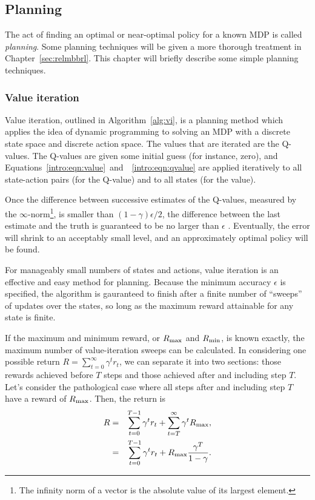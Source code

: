 \subsection{Planning}

The act of finding an optimal or near-optimal policy for a known MDP is called \emph{planning}. Some planning techniques will be given a more thorough treatment in Chapter~\ref{sec:relmbbrl}. This chapter will briefly describe some simple planning techniques.

\subsubsection{Value iteration}

Value iteration, outlined in Algorithm~\ref{alg:vi}, is a planning method which applies the idea of dynamic programming to solving an MDP with a discrete state space and discrete action space. The values that are iterated are the Q-values. The Q-values are given some initial guess (for instance, zero), and Equations~\ref{intro:eqn:value}~and~~\ref{intro:eqn:qvalue} are applied iteratively to all state-action pairs (for the Q-value) and to all states (for the value).

Once the difference between successive estimates of the Q-values, measured by the $\infty$-norm\footnote{The infinity norm of a vector is the absolute value of its largest element.}, is smaller than $(1-\gamma)\epsilon/2$, the difference between the last estimate and the truth is guaranteed to be no larger than $\epsilon$ . Eventually, the error will shrink to an acceptably small level, and an approximately optimal policy will be found.

For manageably small numbers of states and actions, value iteration is an effective and easy method for planning. Because the minimum accuracy $\epsilon$ is specified, the algorithm is gauranteed to finish after a finite number of ``sweeps'' of updates over the states, so long as the maximum reward attainable for any state is finite.


If the maximum and minimum reward, or $R_{\rm max}$ and $R_{\rm min}$, is known exactly, the maximum number of value-iteration sweeps can be calculated.  In considering one possible return $R=\sum_{t=0}^\infty \gamma^t r_t$, we can separate it into two sections: those rewards achieved before $T$ steps and those achieved after and including step $T$. Let's consider the pathological case where all steps after and including step $T$ have a reward of $R_{\rm max}$. Then, the return is
\begin{eqnarray}
R &=& \sum_{t=0}^{T-1} \gamma^t r_t + \sum_{t=T}^\infty \gamma^t R_{\rm max},\\
&=& \sum_{t=0}^{T-1} \gamma^t r_t + R_{\rm max} \frac{\gamma^T}{1-\gamma}.
\end{eqnarray}

